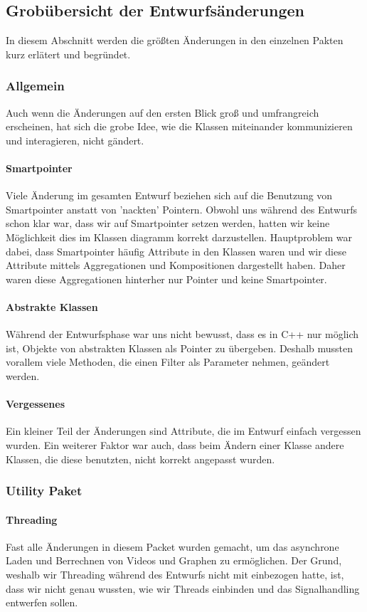 \documentclass{scrartcl}
\begin{document}
{\subsection{Grobübersicht der Entwurfsänderungen}
In diesem Abschnitt werden die größten Änderungen in den einzelnen Pakten kurz erlätert und begründet.
\subsubsection{Allgemein}
Auch wenn die Änderungen auf den ersten Blick groß und umfrangreich erscheinen, hat sich die grobe Idee, wie die Klassen miteinander kommunizieren und interagieren, nicht gändert.
\paragraph{Smartpointer} Viele Änderung im gesamten Entwurf beziehen sich auf die Benutzung von Smartpointer anstatt von 'nackten' Pointern. Obwohl uns während des Entwurfs schon klar war, dass wir auf Smartpointer setzen werden, hatten wir keine Möglichkeit dies im Klassen diagramm korrekt darzustellen. Hauptproblem war dabei, dass Smartpointer häufig Attribute in den Klassen waren und wir diese Attribute mittels Aggregationen und Kompositionen dargestellt haben. Daher waren diese Aggregationen hinterher nur Pointer und keine Smartpointer.
\paragraph{Abstrakte Klassen} Während der Entwurfsphase war uns nicht bewusst, dass es in C++ nur möglich ist, Objekte von abstrakten Klassen als Pointer zu übergeben. Deshalb mussten vorallem viele Methoden, die einen Filter als Parameter nehmen, geändert werden.
\paragraph{Vergessenes} Ein kleiner Teil der Änderungen sind Attribute, die im Entwurf einfach vergessen wurden. Ein weiterer Faktor war auch, dass beim Ändern einer Klasse andere Klassen, die diese benutzten, nicht korrekt angepasst wurden.
\bigskip
\subsubsection{Utility Paket}
\paragraph{Threading}
Fast alle Änderungen in diesem Packet wurden gemacht, um das  asynchrone Laden und Berrechnen von Videos und Graphen zu ermöglichen. Der Grund, weshalb wir Threading während des Entwurfs nicht mit einbezogen hatte, ist, dass wir nicht genau wussten, wie wir Threads einbinden und das Signalhandling entwerfen sollen.
\bigskip
}
\end{document}
